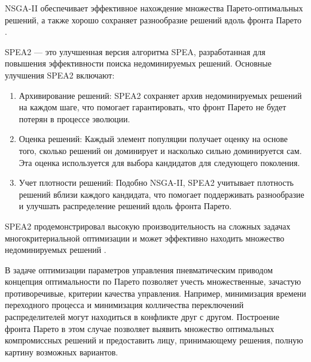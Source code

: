 NSGA-II обеспечивает эффективное нахождение множества Парето-оптимальных решений,
а также хорошо сохраняет разнообразие решений вдоль фронта Парето \cite*{deb2001multi}.

SPEA2 — это улучшенная версия алгоритма SPEA, разработанная для повышения эффективности поиска недоминируемых решений. Основные улучшения SPEA2 включают:

\begin{enumerate}
    \item Архивирование решений: SPEA2 сохраняет архив недоминируемых решений на каждом шаге, что помогает гарантировать,
    что фронт Парето не будет потерян в процессе эволюции.

    \item Оценка решений: Каждый элемент популяции получает оценку на основе того,
    сколько решений он доминирует и насколько сильно доминируется сам. Эта оценка
    используется для выбора кандидатов для следующего поколения.

    \item Учет плотности решений: Подобно NSGA-II, SPEA2 учитывает плотность решений
    вблизи каждого кандидата, что помогает поддерживать разнообразие и улучшать
    распределение решений вдоль фронта Парето.
\end{enumerate}

SPEA2 продемонстрировал высокую производительность на сложных задачах многокритериальной
оптимизации и может эффективно находить множество недоминируемых решений \cite{zitzler2001spea2}.

В задаче оптимизации параметров управления пневматическим приводом концепция оптимальности
по Парето позволяет учесть множественные, зачастую противоречивые, критерии качества управления.
Например, минимизация времени переходного процесса и минимизация колличества переключений распределителей
могут находиться в конфликте друг с другом. Построение фронта Парето в этом случае
позволяет выявить множество оптимальных компромиссных решений и
предоставить лицу, принимающему решения, полную картину возможных вариантов.